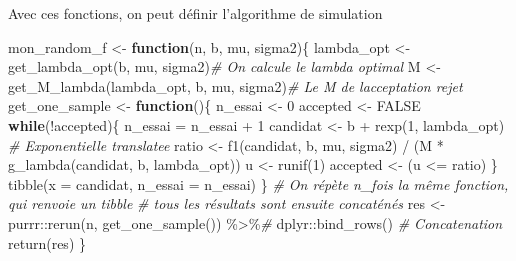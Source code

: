 \documentclass[
]{article}
\newenvironment{Shaded}{\begin{snugshade}}{\end{snugshade}}
\newcommand{\AttributeTok}[1]{\textcolor[rgb]{0.77,0.63,0.00}{#1}}
\newcommand{\CommentTok}[1]{\textcolor[rgb]{0.56,0.35,0.01}{\textit{#1}}}
\newcommand{\ConstantTok}[1]{\textcolor[rgb]{0.00,0.00,0.00}{#1}}
\newcommand{\ControlFlowTok}[1]{\textcolor[rgb]{0.13,0.29,0.53}{\textbf{#1}}}
\newcommand{\DecValTok}[1]{\textcolor[rgb]{0.00,0.00,0.81}{#1}}
\newcommand{\FunctionTok}[1]{\textcolor[rgb]{0.00,0.00,0.00}{#1}}
\newcommand{\NormalTok}[1]{#1}
\newcommand{\OtherTok}[1]{\textcolor[rgb]{0.56,0.35,0.01}{#1}}
\newcommand{\SpecialCharTok}[1]{\textcolor[rgb]{0.00,0.00,0.00}{#1}}
\newenvironment{Correction}%
  { \vspace{\baselineskip}\begin{mdframed}[backgroundcolor=my_green]}%
  {\end{mdframed}}
\begin{document}
\begin{Correction}
Avec ces fonctions, on peut définir l'algorithme de simulation
\end{Correction}

\begin{Shaded}
\begin{Highlighting}[]
\NormalTok{mon\_random\_f }\OtherTok{\textless{}{-}} \ControlFlowTok{function}\NormalTok{(n, b, mu, sigma2)\{}
\NormalTok{  lambda\_opt }\OtherTok{\textless{}{-}} \FunctionTok{get\_lambda\_opt}\NormalTok{(b, mu, sigma2)}\CommentTok{\# On calcule le lambda optimal}
\NormalTok{  M }\OtherTok{\textless{}{-}} \FunctionTok{get\_M\_lambda}\NormalTok{(lambda\_opt, b, mu, sigma2)}\CommentTok{\# Le M de l\textquotesingle{}acceptation rejet}
\NormalTok{  get\_one\_sample }\OtherTok{\textless{}{-}} \ControlFlowTok{function}\NormalTok{()\{}
\NormalTok{    n\_essai }\OtherTok{\textless{}{-}} \DecValTok{0}
\NormalTok{    accepted }\OtherTok{\textless{}{-}} \ConstantTok{FALSE}
    \ControlFlowTok{while}\NormalTok{(}\SpecialCharTok{!}\NormalTok{accepted)\{}
\NormalTok{      n\_essai }\OtherTok{=}\NormalTok{ n\_essai }\SpecialCharTok{+} \DecValTok{1}
\NormalTok{      candidat }\OtherTok{\textless{}{-}}\NormalTok{ b }\SpecialCharTok{+} \FunctionTok{rexp}\NormalTok{(}\DecValTok{1}\NormalTok{, lambda\_opt) }\CommentTok{\# Exponentielle translatee}
\NormalTok{      ratio }\OtherTok{\textless{}{-}} \FunctionTok{f1}\NormalTok{(candidat, b, mu, sigma2) }\SpecialCharTok{/}\NormalTok{ (M }\SpecialCharTok{*} \FunctionTok{g\_lambda}\NormalTok{(candidat, b, lambda\_opt))}
\NormalTok{      u }\OtherTok{\textless{}{-}} \FunctionTok{runif}\NormalTok{(}\DecValTok{1}\NormalTok{)}
\NormalTok{      accepted }\OtherTok{\textless{}{-}}\NormalTok{ (u }\SpecialCharTok{\textless{}=}\NormalTok{ ratio)}
\NormalTok{    \}}
    \FunctionTok{tibble}\NormalTok{(}\AttributeTok{x =}\NormalTok{ candidat, }\AttributeTok{n\_essai =}\NormalTok{ n\_essai)}
\NormalTok{  \}}
  \CommentTok{\# On répète n\_fois la même fonction, qui renvoie un tibble}
  \CommentTok{\# tous les résultats sont ensuite concaténés}
\NormalTok{  res }\OtherTok{\textless{}{-}}\NormalTok{ purrr}\SpecialCharTok{::}\FunctionTok{rerun}\NormalTok{(n, }\FunctionTok{get\_one\_sample}\NormalTok{()) }\SpecialCharTok{\%\textgreater{}\%}\CommentTok{\#}
\NormalTok{    dplyr}\SpecialCharTok{::}\FunctionTok{bind\_rows}\NormalTok{() }\CommentTok{\# Concatenation}
  \FunctionTok{return}\NormalTok{(res)}
\NormalTok{\}}
\end{Highlighting}
\end{Shaded}
\end{document}
